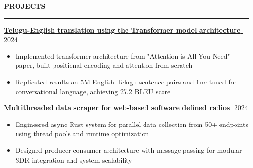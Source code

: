 \documentclass[notitlepage,10pt,a4paper]{article}
\newenvironment{resumesection}[1]{
    \header{#1}
}{}
\newcommand{\header}[1]{
    \vspace{2pt}
    \textcolor{accent1}{\Large \textbf{#1}}
    \vspace{6pt}\hrule\vspace{4pt}
}
\newcommand{\TECH}{
    \textcolor{accent3}{\small\textbf{SKILLS}}\small\,
}
\newcommand{\thingsep}{
    \vspace{4pt}
}
\newcommand{\LINK}[2]{
    \href{#1}{\textbf{#2}\,\,{\small\faExternalLink}}
}
\begin{document}
\begin{resumesection}{PROJECTS}
    \raggedright
    \textcolor{accent2}{\LINK{https://github.com/marisusis/telugu-to-english-with-transformers}{\large Telugu-English translation using the Transformer model architecture}} \hfill {2024} \\
    {\small\begin{itemize}[noitemsep, font=\small, label={-}, leftmargin=*, topsep=0pt, partopsep=0pt]
        \item Implemented transformer architecture from "Attention is All You Need" paper, built positional encoding and attention from scratch
        \item Replicated results on 5M English-Telugu sentence pairs and fine-tuned for conversational language, achieving 27.2 BLEU score
    \end{itemize}}
    \thingsep
    \raggedright
    \textcolor{accent2}{\LINK{https://github.com/marisusis/sdr-scraper}{\large Multithreaded data scraper for web-based software defined radios}} \hfill {2024} \\
    {\small\begin{itemize}[noitemsep, font=\small, label={-}, leftmargin=*, topsep=0pt, partopsep=0pt]
      \item Engineered async Rust system for parallel data collection from 50+ endpoints using thread pools and runtime optimization
      \item Designed producer-consumer architecture with message passing for modular SDR integration and system scalability
    \end{itemize}}
    \thingsep
    

\end{resumesection}
\end{document}
